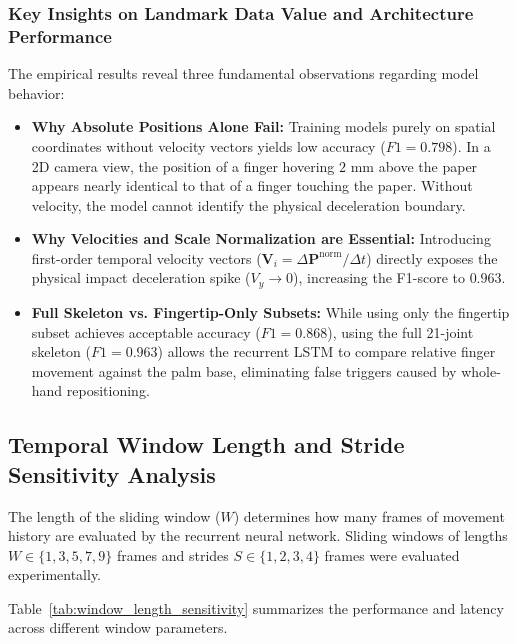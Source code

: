 \subsubsection{Key Insights on Landmark Data Value and Architecture Performance}
The empirical results reveal three fundamental observations regarding model behavior:
\begin{itemize}
    \item \textbf{Why Absolute Positions Alone Fail:} Training models purely on spatial coordinates without velocity vectors yields low accuracy ($F1 = 0.798$). In a 2D camera view, the position of a finger hovering $2\text{ mm}$ above the paper appears nearly identical to that of a finger touching the paper. Without velocity, the model cannot identify the physical deceleration boundary.
    \item \textbf{Why Velocities and Scale Normalization are Essential:} Introducing first-order temporal velocity vectors ($\mathbf{V}_i = \Delta \mathbf{P}^{\text{norm}} / \Delta t$) directly exposes the physical impact deceleration spike ($V_y \to 0$), increasing the F1-score to $0.963$.
    \item \textbf{Full Skeleton vs. Fingertip-Only Subsets:} While using only the fingertip subset achieves acceptable accuracy ($F1 = 0.868$), using the full 21-joint skeleton ($F1 = 0.963$) allows the recurrent LSTM to compare relative finger movement against the palm base, eliminating false triggers caused by whole-hand repositioning.
\end{itemize}

\subsection{Temporal Window Length and Stride Sensitivity Analysis}
\label{subsec:test_window_sensitivity}
The length of the sliding window ($W$) determines how many frames of movement history are evaluated by the recurrent neural network. Sliding windows of lengths $W \in \{1, 3, 5, 7, 9\}$ frames and strides $S \in \{1, 2, 3, 4\}$ frames were evaluated experimentally.

Table~\ref{tab:window_length_sensitivity} summarizes the performance and latency across different window parameters.

